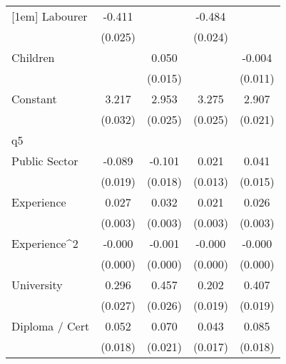 {\begin{tabular}{l*{4}{c}}
[1em]
Labourer            &      -0.411\sym{***}&                     &      -0.484\sym{***}&                     \\
                    &     (0.025)         &                     &     (0.024)         &                     \\
[1em]
Children            &                     &       0.050\sym{***}&                     &      -0.004         \\
                    &                     &     (0.015)         &                     &     (0.011)         \\
[1em]
Constant            &       3.217\sym{***}&       2.953\sym{***}&       3.275\sym{***}&       2.907\sym{***}\\
                    &     (0.032)         &     (0.025)         &     (0.025)         &     (0.021)         \\
\hline
q5                  &                     &                     &                     &                     \\
Public Sector       &      -0.089\sym{***}&      -0.101\sym{***}&       0.021         &       0.041\sym{**} \\
                    &     (0.019)         &     (0.018)         &     (0.013)         &     (0.015)         \\
[1em]
Experience          &       0.027\sym{***}&       0.032\sym{***}&       0.021\sym{***}&       0.026\sym{***}\\
                    &     (0.003)         &     (0.003)         &     (0.003)         &     (0.003)         \\
[1em]
Experience^{2}      &      -0.000\sym{***}&      -0.001\sym{***}&      -0.000\sym{***}&      -0.000\sym{***}\\
                    &     (0.000)         &     (0.000)         &     (0.000)         &     (0.000)         \\
[1em]
University          &       0.296\sym{***}&       0.457\sym{***}&       0.202\sym{***}&       0.407\sym{***}\\
                    &     (0.027)         &     (0.026)         &     (0.019)         &     (0.019)         \\
[1em]
Diploma / Cert      &       0.052\sym{**} &       0.070\sym{***}&       0.043\sym{*}  &       0.085\sym{***}\\
                    &     (0.018)         &     (0.021)         &     (0.017)         &     (0.018)         \\

\end{tabular}}
